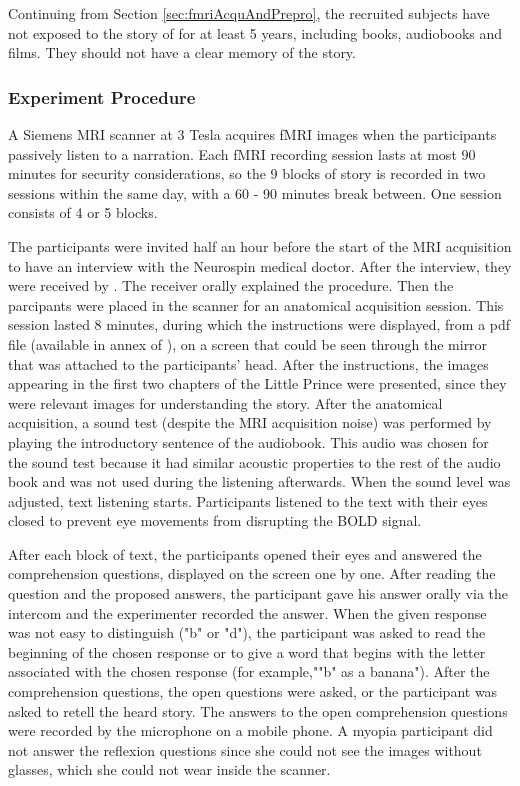 Continuing from Section \ref{sec:fmriAcquAndPrepro}, the recruited subjects have not exposed to the story of  for at least 5 years, including books, audiobooks and films. They should not have a clear memory of the story. 
\subsubsection{Experiment Procedure}
A Siemens MRI scanner at 3 Tesla acquires fMRI images when the participants passively listen to a narration. Each fMRI recording session lasts at most 90 minutes for security considerations, so the 9 blocks of story is recorded in two sessions within the same day, with a 60 - 90 minutes break between. One session consists of 4 or 5 blocks. 

The participants were invited half an hour before the start of the MRI acquisition to have an interview with the Neurospin medical doctor. After the interview, they were received by \citeauthor{todorovicAnalysesIRMfLors2018}. The receiver orally explained the procedure. Then the parcipants were placed in the scanner for an anatomical acquisition session. This session lasted 8 minutes, during which the instructions were displayed, from a pdf file (available in annex of \textcite{todorovicAnalysesIRMfLors2018}), on a screen that could be seen through the mirror that was attached to the participants' head. After the instructions, the images appearing in the first two chapters of the Little Prince were presented, since they were relevant images for understanding the story. After the anatomical acquisition, a sound test (despite the MRI acquisition noise) was performed by playing the introductory sentence of the audiobook. This audio was chosen for the sound test because it had similar acoustic properties to the rest of the audio book and was not used during the listening afterwards. When the sound level was adjusted, text listening starts. Participants listened to the text with their eyes closed to prevent eye movements from disrupting the BOLD signal.

After each block of text, the participants opened their eyes and answered the comprehension questions, displayed on the screen one by one. After reading the question and the proposed answers, the participant gave his answer orally via the intercom and the experimenter recorded the answer. When the given response was not easy to distinguish ("b" or "d"), the participant was asked to read the beginning of the chosen response or to give a word that begins with the letter associated with the chosen response (for example,""b" as a banana"). After the comprehension questions, the open questions were asked, or the participant was asked to retell the heard story. The answers to the open comprehension questions were recorded by the microphone on a mobile phone. A myopia participant did not answer the reflexion questions since she could not see the images without glasses, which she could not wear inside the scanner. 

